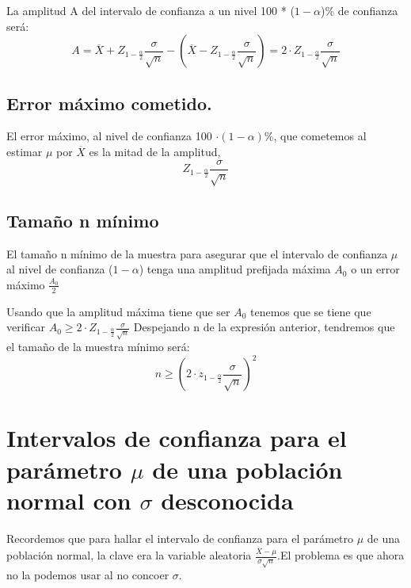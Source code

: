 \documentclass[
]{article}
\begin{document}
La amplitud A del intervalo de confianza a un nivel 100 *
(\(1-\alpha\))\% de confianza será:
\[A = \overline{X}+ Z_{1-\frac{\alpha}{2}}\frac{\sigma}{\sqrt{n}}-(\overline{X}- Z_{1-\frac{\alpha}{2}}\frac{\sigma}{\sqrt{n}}) = 2\cdot Z_{1-\frac{\alpha}{2}}\frac{\sigma}{\sqrt{n}}\]

\hypertarget{error-muxe1ximo-cometido.}{%
\subsection{Error máximo cometido.}\label{error-muxe1ximo-cometido.}}

El error máximo, al nivel de confianza 100 \(\cdot (1- \alpha)\)\%, que
cometemos al estimar \(\mu\) por \(\overline{X}\) es la mitad de la
amplitud, \[Z_{1-\frac{\alpha}{2}}\frac{\sigma}{\sqrt{n}}\]

\hypertarget{tamauxf1o-n-muxednimo}{%
\subsection{Tamaño n mínimo}\label{tamauxf1o-n-muxednimo}}

El tamaño n mínimo de la muestra para asegurar que el intervalo de
confianza \(\mu\) al nivel de confianza (\(1-\alpha\)) tenga una
amplitud prefijada máxima \(A_0\) o un error máximo \(\frac{A_0}{2}\)

Usando que la amplitud máxima tiene que ser \(A_0\) tenemos que se tiene
que verificar
\(A_0 \geq 2 \cdot Z_{1-\frac{\alpha}{2}}\frac{\sigma}{\sqrt{n}}\)
Despejando n de la expresión anterior, tendremos que el tamaño de la
muestra mínimo será:
\[n \geq (2 \cdot z_{1-\frac{\alpha}{2}}\frac{\sigma}{\sqrt{n}})^2\]

\hypertarget{intervalos-de-confianza-para-el-paruxe1metro-mu-de-una-poblaciuxf3n-normal-con-sigma-desconocida}{%
\section{\texorpdfstring{Intervalos de confianza para el parámetro
\(\mu\) de una población normal con \(\sigma\)
desconocida}{Intervalos de confianza para el parámetro \textbackslash mu de una población normal con \textbackslash sigma desconocida}}\label{intervalos-de-confianza-para-el-paruxe1metro-mu-de-una-poblaciuxf3n-normal-con-sigma-desconocida}}

Recordemos que para hallar el intervalo de confianza para el parámetro
\(\mu\) de una población normal, la clave era la variable aleatoria
\(\frac{\overline{X}-\mu} {\sigma \sqrt{n}}\).El problema es que ahora
no la podemos usar al no concoer \(\sigma\).
\end{document}
